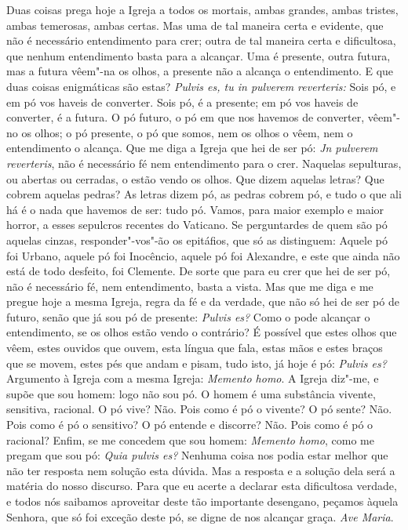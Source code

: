 \noindent{}Duas coisas prega hoje a Igreja a todos os mortais, ambas grandes, ambas
tristes, ambas temerosas, ambas certas. Mas uma de tal maneira certa e
evidente, que não é necessário entendimento para crer; outra de tal
maneira certa e dificultosa, que nenhum entendimento basta para a
alcançar. Uma é presente, outra futura, mas a futura vêem"-na os olhos, a
presente não a alcança o entendimento. E que duas coisas enigmáticas são
estas? \emph{Pulvis es, tu in pulverem reverteris:} Sois pó, e em pó vos
haveis de converter. Sois pó, é a presente; em pó vos haveis de
converter, é a futura. O pó futuro, o pó em que nos havemos de
converter, vêem"-no os olhos; o pó presente, o pó que somos, nem os olhos
o vêem, nem o entendimento o alcança. Que me diga a Igreja que hei de
ser pó: \emph{Jn pulverem reverteris}, não é necessário fé nem
entendimento para o crer. Naquelas sepulturas, ou abertas ou cerradas, o
estão vendo os olhos. Que dizem aquelas letras? Que cobrem aquelas
pedras? As letras dizem pó, as pedras cobrem pó, e tudo o que ali há é o
nada que havemos de ser: tudo pó. Vamos, para maior exemplo e maior
horror, a esses sepulcros recentes do Vaticano. Se perguntardes de quem
são pó aquelas cinzas, responder"-vos"-ão os epitáfios, que só as
distinguem: Aquele pó foi Urbano, aquele pó foi Inocêncio,
aquele pó foi Alexandre, e este que ainda não está de todo desfeito, foi
Clemente. De sorte que para eu crer que hei de ser pó, não é necessário
fé, nem entendimento, basta a vista. Mas que me diga e me pregue hoje a
mesma Igreja, regra da fé e da verdade, que não só hei de ser pó de
futuro, senão que já sou pó de presente: \emph{Pulvis es?} Como o pode
alcançar o entendimento, se os olhos estão vendo o contrário? É possível
que estes olhos que vêem, estes ouvidos que ouvem, esta língua que fala,
estas mãos e estes braços que se movem, estes pés que andam e pisam,
tudo isto, já hoje é pó: \emph{Pulvis es?} Argumento à Igreja com a
mesma Igreja: \emph{Memento homo}. A Igreja diz"-me, e supõe que sou
homem: logo não sou pó. O homem é uma substância vivente, sensitiva,
racional. O pó vive? Não. Pois como é pó o vivente? O pó sente? Não.
Pois como é pó o sensitivo? O pó entende e discorre? Não. Pois como é pó
o racional? Enfim, se me concedem que sou homem: \emph{Memento homo},
como me pregam que sou pó: \emph{Quia pulvis es?} Nenhuma coisa nos
podia estar melhor que não ter resposta nem solução esta dúvida. Mas a
resposta e a solução dela será a matéria do nosso discurso. Para que eu
acerte a declarar esta dificultosa verdade, e todos nós saibamos
aproveitar deste tão importante desengano, peçamos àquela Senhora, que
só foi exceção deste pó, se digne de nos alcançar graça. \emph{Ave Maria}.

